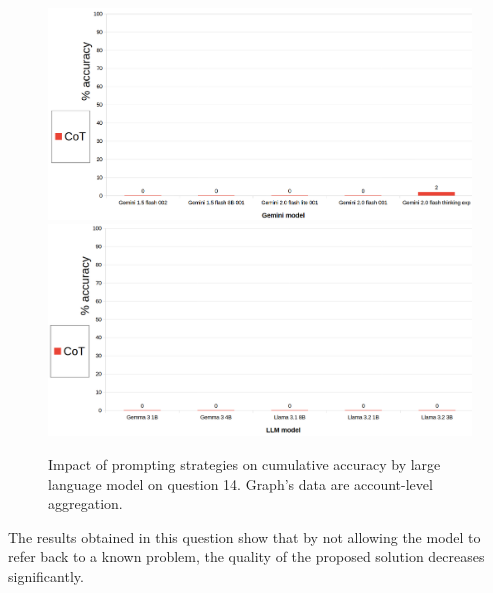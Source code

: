 \documentclass[12pt]{article}
\begin{document}
\begin{figure}[H]
    \centering
            \includegraphics[width=1\textwidth]{q302Gemini.png}
            \includegraphics[width=1\textwidth]{q302Other.png}
    \caption[Accuracy on Question 14 by LLM]{Impact of prompting strategies on cumulative accuracy by large language model on question 14. Graph's data are account-level aggregation.}
    \end{figure} 
The results obtained in this question show that by not allowing the model to refer back to a known problem, the quality of the proposed solution decreases significantly.\\

\vspace{2cm}
\end{document}
